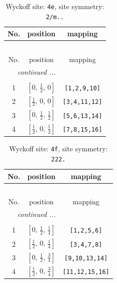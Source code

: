 \documentclass[fleqn,8pt]{jsarticle}
\begin{document}
\begin{longtable}{ccc}
\caption{Wyckoff site: {\tt 4e}, site symmetry: {\tt 2/m..}}
 \\
 \hline \hline
No. & position & mapping \\ \hline \endfirsthead

\multicolumn{2}{l}{\tablename\ \thetable{}} \\
 \hline \hline
No. & position & mapping \\ \hline \endhead

 \hline \hline
\multicolumn{2}{r}{\footnotesize\it continued ...} \\ \endfoot

 \hline \hline
\multicolumn{2}{r}{} \\ \endlastfoot

1 & $\left[ 0,\, \frac{1}{2},\, 0 \right]$ & {\tt [1,2,9,10]} \\ \hline
2 & $\left[ \frac{1}{2},\, 0,\, 0 \right]$ & {\tt [3,4,11,12]} \\ \hline
3 & $\left[ 0,\, \frac{1}{2},\, \frac{1}{2} \right]$ & {\tt [5,6,13,14]} \\ \hline
4 & $\left[ \frac{1}{2},\, 0,\, \frac{1}{2} \right]$ & {\tt [7,8,15,16]} \\
\end{longtable}
\renewcommand{\arraystretch}{1.2}
\begin{longtable}{ccc}
\caption{Wyckoff site: {\tt 4f}, site symmetry: {\tt 222.}}
 \\
 \hline \hline
No. & position & mapping \\ \hline \endfirsthead

\multicolumn{2}{l}{\tablename\ \thetable{}} \\
 \hline \hline
No. & position & mapping \\ \hline \endhead

 \hline \hline
\multicolumn{2}{r}{\footnotesize\it continued ...} \\ \endfoot

 \hline \hline
\multicolumn{2}{r}{} \\ \endlastfoot

1 & $\left[ 0,\, \frac{1}{2},\, \frac{1}{4} \right]$ & {\tt [1,2,5,6]} \\ \hline
2 & $\left[ \frac{1}{2},\, 0,\, \frac{1}{4} \right]$ & {\tt [3,4,7,8]} \\ \hline
3 & $\left[ 0,\, \frac{1}{2},\, \frac{3}{4} \right]$ & {\tt [9,10,13,14]} \\ \hline
4 & $\left[ \frac{1}{2},\, 0,\, \frac{3}{4} \right]$ & {\tt [11,12,15,16]} \\
\end{longtable}
\end{document}
